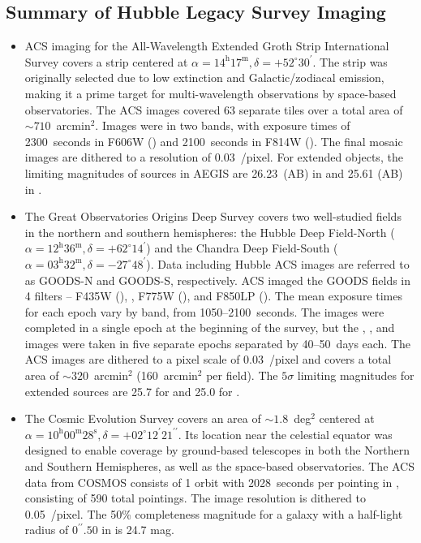 \documentclass[twocolumn]{aastex6}
\begin{document}
\subsection{Summary of Hubble Legacy Survey Imaging}\label{ssec:legacy_surveys}

\begin{itemize}
\item \hubble{} ACS imaging for the All-Wavelength Extended Groth Strip International Survey \citep[AEGIS;][]{dav07} covers a strip centered at $\alpha=14^\textrm{h}17^\textrm{m}, \delta=+52^\circ30^\prime$. The strip was originally selected due to low extinction and Galactic/zodiacal emission, making it a prime target for multi-wavelength observations by space-based observatories. The ACS images covered 63 separate tiles over a total area of $\sim710$~arcmin$^2$. Images were in two bands, with exposure times of 2300~seconds in F606W (\Vband) and 2100~seconds in F814W (\Iband). The final mosaic images are dithered to a resolution of 0.03~\arcsec/pixel. For extended objects, the limiting magnitudes of sources in AEGIS are 26.23~(AB) in \Vband{} and 25.61 (AB) in \Iband. 

\item The Great Observatories Origins Deep Survey \citep[GOODS;][]{gia04} covers two well-studied fields in the northern and southern hemispheres: the Hubble Deep Field-North ($\alpha=12^\textrm{h}36^\textrm{m}, \delta=+62^\circ14^\prime$) and the Chandra Deep Field-South ($\alpha=03^\textrm{h}32^\textrm{m}, \delta=-27^\circ48^\prime$). Data including Hubble ACS images are referred to as GOODS-N and GOODS-S, respectively. ACS imaged the GOODS fields in 4 filters -- F435W (\Bband), \Vband, F775W (\iband), and F850LP (\zband). The mean exposure times for each epoch vary by band, from 1050--2100~seconds. The \Bband{} images were completed in a single epoch at the beginning of the survey, but the \Vband, \iband, and \zband{} images were taken in five separate epochs separated by 40--50~days each. The ACS images are dithered to a pixel scale of 0.03~\arcsec/pixel and covers a total area of $\sim320$~arcmin$^2$ (160~arcmin$^2$ per field). The $5\sigma$ limiting magnitudes for extended sources are 25.7 for \Vband{} and 25.0 for \iband. 

\item The Cosmic Evolution Survey \citep[COSMOS;][]{sco07} covers an area of $\sim1.8$~deg$^2$ centered at $\alpha=10^\textrm{h}00^\textrm{m}28^\textrm{s}, \delta=+02^\circ12^\prime21^{\prime\prime}$. Its location near the celestial equator was designed to enable coverage by ground-based telescopes in both the Northern and Southern Hemispheres, as well as the space-based observatories. The \hst{} ACS data from COSMOS consists of 1 orbit with 2028~seconds per pointing in \Iband, consisting of 590 total pointings. The image resolution is dithered to 0.05~\arcsec/pixel. The 50\% completeness magnitude for a galaxy with a half-light radius of $0^{\prime\prime}.50$ in \Iband{} is 24.7 mag. 


\end{itemize}
\end{document}
